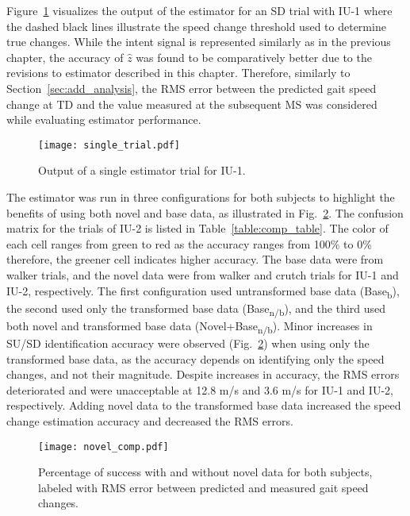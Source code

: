 Figure~\ref{fig:single_trial} visualizes the output of the estimator for an SD trial with IU-1 where the dashed black lines illustrate the speed change threshold used to determine true changes. While the intent signal is represented similarly as in the previous chapter, the accuracy of $ \hat{z} $ was found to be comparatively better due to the revisions to estimator described in this chapter. Therefore, similarly to Section~\ref{sec:add_analysis}, the RMS error between the predicted gait speed change at TD and the value measured at the subsequent MS was considered while evaluating estimator performance. 

\begin{figure}
	\centering
	\texttt{[image: single\_trial.pdf]}
	\caption{Output of a single estimator trial for IU-1.}\label{fig:single_trial}
\end{figure}

The  estimator was run in three configurations for both subjects to highlight the benefits of using both novel and base data, as illustrated in Fig.~\ref{fig:novel_comp}. The confusion matrix for the trials of IU-2 is listed in Table~\ref{table:comp_table}. The color of each cell ranges from green to red as the accuracy ranges from 100\% to 0\% therefore, the greener cell indicates higher accuracy. The base data were from walker trials, and the novel data were from walker and crutch trials for IU-1 and IU-2, respectively. The first configuration used untransformed base data (Base\textsubscript{b}), the second used only the transformed base data (Base\textsubscript{n/b}), and the third used both novel and transformed base data (Novel+Base\textsubscript{n/b}). Minor increases in SU/SD identification accuracy were observed (Fig.~\ref{fig:novel_comp}) when using only the transformed base data, as the accuracy depends on identifying only the speed changes, and not their magnitude. Despite increases in accuracy, the RMS errors deteriorated and were unacceptable at 12.8 m/s and 3.6 m/s for IU-1 and IU-2, respectively. Adding novel data to the transformed base data increased the speed change estimation accuracy and decreased the RMS errors. 

\begin{figure}
	\centering
	\texttt{[image: novel\_comp.pdf]}
	\caption{Percentage of success with and without novel data for both subjects, labeled with RMS error between predicted and measured gait speed changes.}\label{fig:novel_comp}
\end{figure}

